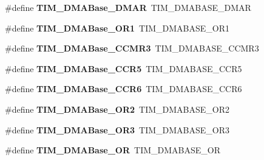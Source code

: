 \begin{DoxyCompactItemize}
\#define {\bfseries T\+I\+M\+\_\+\+D\+M\+A\+Base\+\_\+\+D\+M\+AR}~T\+I\+M\+\_\+\+D\+M\+A\+B\+A\+S\+E\+\_\+\+D\+M\+AR
\item 
\mbox{\label{group___h_a_l___t_i_m___aliased___defines_ga6868a38c42996b41d072025ce428c645}} 
\#define {\bfseries T\+I\+M\+\_\+\+D\+M\+A\+Base\+\_\+\+O\+R1}~T\+I\+M\+\_\+\+D\+M\+A\+B\+A\+S\+E\+\_\+\+O\+R1
\item 
\mbox{\label{group___h_a_l___t_i_m___aliased___defines_gaeea36845ff52e436a46a294d0d01a193}} 
\#define {\bfseries T\+I\+M\+\_\+\+D\+M\+A\+Base\+\_\+\+C\+C\+M\+R3}~T\+I\+M\+\_\+\+D\+M\+A\+B\+A\+S\+E\+\_\+\+C\+C\+M\+R3
\item 
\mbox{\label{group___h_a_l___t_i_m___aliased___defines_ga8e5e6af97873ab26e62274624f31adae}} 
\#define {\bfseries T\+I\+M\+\_\+\+D\+M\+A\+Base\+\_\+\+C\+C\+R5}~T\+I\+M\+\_\+\+D\+M\+A\+B\+A\+S\+E\+\_\+\+C\+C\+R5
\item 
\mbox{\label{group___h_a_l___t_i_m___aliased___defines_ga9ab65ba1f7609de8bd7bf20319e60232}} 
\#define {\bfseries T\+I\+M\+\_\+\+D\+M\+A\+Base\+\_\+\+C\+C\+R6}~T\+I\+M\+\_\+\+D\+M\+A\+B\+A\+S\+E\+\_\+\+C\+C\+R6
\item 
\mbox{\label{group___h_a_l___t_i_m___aliased___defines_ga2a1e120dc725fd26c37c29cf97fdcaa9}} 
\#define {\bfseries T\+I\+M\+\_\+\+D\+M\+A\+Base\+\_\+\+O\+R2}~T\+I\+M\+\_\+\+D\+M\+A\+B\+A\+S\+E\+\_\+\+O\+R2
\item 
\mbox{\label{group___h_a_l___t_i_m___aliased___defines_gae675fedf9cf67bd86a36f17d37f99106}} 
\#define {\bfseries T\+I\+M\+\_\+\+D\+M\+A\+Base\+\_\+\+O\+R3}~T\+I\+M\+\_\+\+D\+M\+A\+B\+A\+S\+E\+\_\+\+O\+R3
\item 
\mbox{\label{group___h_a_l___t_i_m___aliased___defines_gad6a75d19df73bae091a0e649fba7339c}} 
\#define {\bfseries T\+I\+M\+\_\+\+D\+M\+A\+Base\+\_\+\+OR}~T\+I\+M\+\_\+\+D\+M\+A\+B\+A\+S\+E\+\_\+\+OR
\item 
\mbox{\label{group___h_a_l___t_i_m___aliased___defines_ga5bff72fbe94b1ae5a710e402c9868b23}} 

\end{DoxyCompactItemize}
